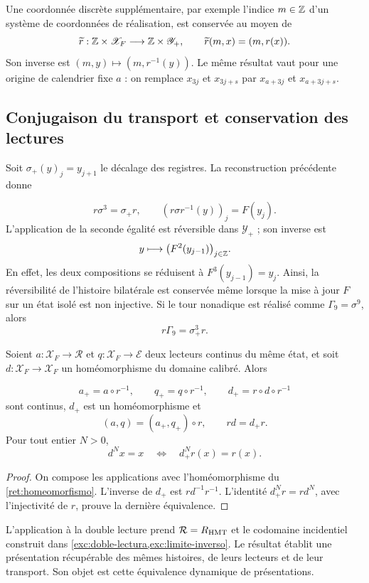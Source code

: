 Une coordonnée discrète supplémentaire, par exemple l’indice \(m\in\mathbb Z\)
d’un système de coordonnées de réalisation, est conservée au moyen de
\[
 \widetilde r:\mathbb Z\times\mathscr X_F
 \longrightarrow\mathbb Z\times\mathscr Y_+,
 \qquad \widetilde r(m,x)=(m,r(x)).
\]
Son inverse est \((m,y)\mapsto(m,r^{-1}(y))\).
Le même résultat vaut pour une origine de calendrier fixe \(a\) :
on remplace \(x_{3j}\) et \(x_{3j+s}\) par
\(x_{a+3j}\) et \(x_{a+3j+s}\).

\subsection{Conjugaison du transport et conservation des lectures
}

Soit \(\sigma_+(y)_j=y_{j+1}\) le décalage des registres.
La reconstruction précédente donne

\begin{equation}
 r\sigma^3=\sigma_+r,\qquad
 (r\sigma r^{-1}(y))_j=F(y_j).
 \label{ret:conjugacion}
\end{equation}
L’application de la seconde égalité est réversible dans
\(\mathscr Y_+\) ; son inverse est
\[
 y\longmapsto\bigl(F^2(y_{j-1})\bigr)_{j\in\mathbb Z}.
\]
En effet, les deux compositions se réduisent à
\(F^3(y_{j-1})=y_j\).
Ainsi, la réversibilité de l’histoire bilatérale est conservée même
lorsque la mise à jour \(F\) sur un état isolé est non injective.
Si le tour nonadique est réalisé comme \(\Gamma_9=\sigma^9\), alors
\begin{equation}
 r\Gamma_9=\sigma_+^3r.
 \label{ret:vuelta-nonadica}
\end{equation}

\begin{corollary}
\label{ret:lecturas}
Soient \(a:\mathscr X_F\to\mathcal R\) et
\(q:\mathscr X_F\to\mathcal E\) deux lecteurs continus du même
état, et soit \(d:\mathscr X_F\to\mathscr X_F\) un homéomorphisme du
domaine calibré. Alors

\[
 a_+=a\circ r^{-1},\qquad
 q_+=q\circ r^{-1},\qquad
 d_+=r\circ d\circ r^{-1}
\]
sont continus, \(d_+\) est un homéomorphisme et
\begin{equation}
 (a,q)=(a_+,q_+)\circ r,\qquad rd=d_+r.
 \label{ret:factorizacion}
\end{equation}
Pour tout entier \(N>0\),
\[
 d^Nx=x\quad\Longleftrightarrow\quad d_+^Nr(x)=r(x).
\]
\end{corollary}
\begin{proof}
On compose les applications avec l’homéomorphisme du
\cref{ret:homeomorfismo}. L’inverse de \(d_+\) est
\(rd^{-1}r^{-1}\). L’identité
\(d_+^Nr=rd^N\), avec l’injectivité de \(r\), prouve la
dernière équivalence.
\end{proof}

L’application à la double lecture prend
\(\mathcal R=R_{\rm HMT}\) et le codomaine incidentiel construit dans
\cref{exc:doble-lectura,exc:limite-inverso}.
Le résultat établit une présentation récupérable des mêmes
histoires, de leurs lecteurs et de leur transport. Son objet est cette
équivalence dynamique de présentations.

